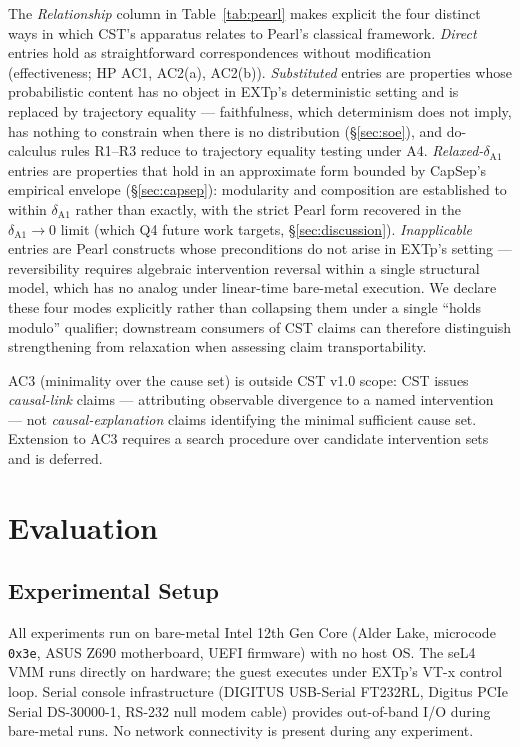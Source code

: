 \documentclass[conference]{IEEEtran}
\begin{document}
The \emph{Relationship} column in Table~\ref{tab:pearl} makes
explicit the four distinct ways in which CST's apparatus relates
to Pearl's classical framework. \emph{Direct} entries hold as
straightforward correspondences without modification
(effectiveness; HP AC1, AC2(a), AC2(b)). \emph{Substituted} entries
are properties whose probabilistic content has no object in EXTp's
deterministic setting and is replaced by trajectory equality ---
faithfulness, which determinism does not imply, has nothing to
constrain when there is no distribution (\S\ref{sec:soe}), and
do-calculus rules R1--R3 reduce to trajectory equality testing under
A4. \emph{Relaxed-$\delta_{\text{A1}}$}
entries are properties that hold in an approximate form bounded by
CapSep's empirical envelope (\S\ref{sec:capsep}): modularity and
composition are established to within $\delta_{\text{A1}}$ rather
than exactly, with the strict Pearl form recovered in the
$\delta_{\text{A1}} \to 0$ limit (which Q4 future work targets,
\S\ref{sec:discussion}). \emph{Inapplicable} entries are Pearl
constructs whose preconditions do not arise in EXTp's setting ---
reversibility requires algebraic intervention reversal within a
single structural model, which has no analog under linear-time
bare-metal execution. We declare these four modes explicitly
rather than collapsing them under a single ``holds modulo''
qualifier; downstream consumers of CST claims can therefore
distinguish strengthening from relaxation when assessing claim
transportability.

AC3 (minimality over the cause set) is outside CST v1.0 scope: CST
issues \emph{causal-link} claims --- attributing observable
divergence to a named intervention --- not
\emph{causal-explanation} claims identifying the minimal sufficient
cause set. Extension to AC3 requires a search procedure over
candidate intervention sets and is deferred.

\section{Evaluation}\label{sec:eval}

\subsection{Experimental Setup}

All experiments run on bare-metal Intel 12th Gen Core (Alder Lake,
microcode \texttt{0x3e}, ASUS Z690 motherboard, UEFI firmware) with
no host OS. The seL4 VMM runs directly on hardware; the guest
executes under EXTp's VT-x control loop. Serial console infrastructure
(DIGITUS USB-Serial FT232RL, Digitus PCIe Serial DS-30000-1, RS-232
null modem cable) provides out-of-band I/O during bare-metal runs.
No network connectivity is present during any experiment.
\end{document}
